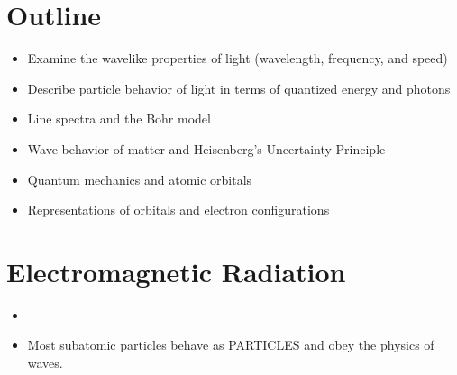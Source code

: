 \documentclass[
	chapter=7,
	title={Quantum Theory {\&} the Electronic Structure of Atoms},
	showanswers=true,
]{chem122notes}
\begin{document}
\section{Outline}\label{sec:outline-7}
\begin{itemize}
	\item Examine the wavelike properties of light (wavelength, frequency, and speed)
	\item Describe particle behavior of light in terms of quantized energy and photons
	\item Line spectra and the Bohr model
	\item Wave behavior of matter and Heisenberg's Uncertainty Principle
	\item Quantum mechanics and atomic orbitals
	\item Representations of orbitals and electron configurations
\end{itemize}

\section{Electromagnetic Radiation}\label{sec:electromagnetic-radiation}
\begin{itemize}
	\item {}
	\item Most subatomic particles behave as PARTICLES and obey the physics of waves.
\end{itemize}
\end{document}
